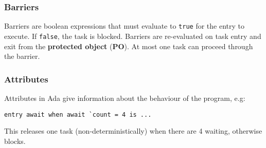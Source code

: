 \documentclass[11pt]{article}
\begin{document}
\subsubsection{Barriers}
\label{sec:org2303eb6}
Barriers are boolean expressions that must evaluate to \texttt{true} for the entry to execute.
If \texttt{false}, the task is blocked.
Barriers are re-evaluated on task entry and exit from the \textbf{protected object} (\textbf{PO}).
At most one task can proceed through the barrier.

\subsubsection{Attributes}
\label{sec:orgea96a9c}
Attributes in Ada give information about the behaviour of the program, e.g:
\begin{verbatim}
entry await when await `count = 4 is ...
\end{verbatim}
This releases one task (non-deterministically) when there are 4 waiting, otherwise blocks.
\end{document}
